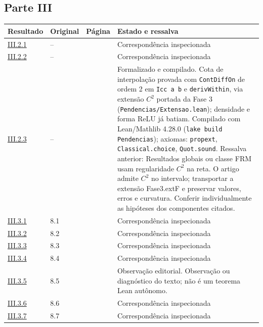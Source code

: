 \subsection*{Parte III}
\small
\begin{longtable}{@{}p{.11\linewidth}p{.09\linewidth}p{.09\linewidth}p{.59\linewidth}@{}}
\toprule Resultado & Original & Página & Estado e ressalva\\\midrule\endhead
\hyperref[map:artigo_2:2.1]{III.2.1} & -- & \pageref{map:artigo_2:2.1} & Correspondência inspecionada\\[4pt]
\hyperref[map:artigo_2:2.2]{III.2.2} & -- & \pageref{map:artigo_2:2.2} & Correspondência inspecionada\\[4pt]
\hyperref[map:artigo_2:2.3]{III.2.3} & -- & \pageref{map:artigo_2:2.3} & Formalizado e compilado. Cota de interpolação provada com \texttt{ContDiffOn} de ordem 2 em \texttt{Icc a b} e \texttt{derivWithin}, via extensão $C^2$ portada da Fase 3 (\texttt{Pendencias/Extensao.lean}); densidade e forma ReLU já batiam. Compilado com Lean/Mathlib 4.28.0 (\texttt{lake build Pendencias}); axiomas: \texttt{propext}, \texttt{Classical.choice}, \texttt{Quot.sound}. Ressalva anterior: Resultados globais ou classe FRM usam regularidade $C^2$ na reta. O artigo admite $C^2$ no intervalo; transportar a extensão Fase3.extF e preservar valores, erros e curvatura. Conferir individualmente as hipóteses dos componentes citados.\\[4pt]
\hyperref[map:artigo_2:3.1]{III.3.1} & 8.1 & \pageref{map:artigo_2:3.1} & Correspondência inspecionada\\[4pt]
\hyperref[map:artigo_2:3.2]{III.3.2} & 8.2 & \pageref{map:artigo_2:3.2} & Correspondência inspecionada\\[4pt]
\hyperref[map:artigo_2:3.3]{III.3.3} & 8.3 & \pageref{map:artigo_2:3.3} & Correspondência inspecionada\\[4pt]
\hyperref[map:artigo_2:3.4]{III.3.4} & 8.4 & \pageref{map:artigo_2:3.4} & Correspondência inspecionada\\[4pt]
\hyperref[map:artigo_2:3.5]{III.3.5} & 8.5 & \pageref{map:artigo_2:3.5} & Observação editorial. Observação ou diagnóstico do texto; não é um teorema Lean autônomo.\\[4pt]
\hyperref[map:artigo_2:3.6]{III.3.6} & 8.6 & \pageref{map:artigo_2:3.6} & Correspondência inspecionada\\[4pt]
\hyperref[map:artigo_2:3.7]{III.3.7} & 8.7 & \pageref{map:artigo_2:3.7} & Correspondência inspecionada\\[4pt]

\end{longtable}
